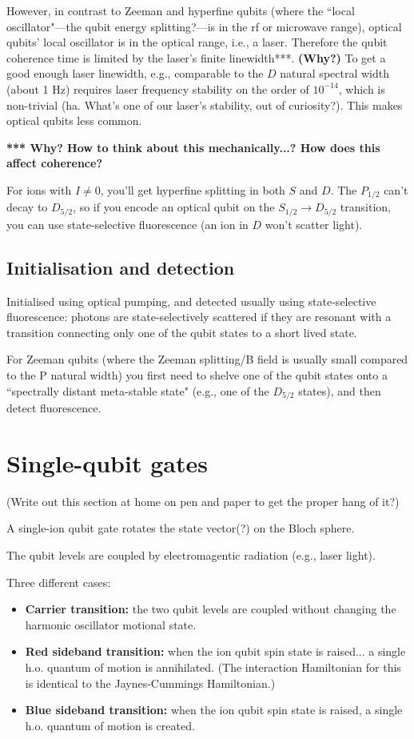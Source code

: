 \documentclass{article}
\begin{document}
However, in contrast to Zeeman and hyperfine qubits (where the ``local oscillator"---the qubit energy splitting?---is in the rf or microwave range), optical qubits' local oscillator is in the optical range, i.e., a laser. Therefore the qubit coherence time is limited by the laser's finite linewidth***. \textbf{(Why?)} To get a good enough laser linewidth, e.g., comparable to the $D$ natural spectral width (about 1 Hz) requires laser frequency stability on the order of $10^{-14}$, which is non-trivial (ha. What's one of our laser's stability, out of curiosity?). This makes optical qubits less common.

\textbf{*** Why? How to think about this mechanically...? How does this affect coherence?}

For ions with $I \neq 0$, you'll get hyperfine splitting in both $S$ and $D$. The $P_{1/2}$ can't decay to $D_{5/2}$, so if you encode an optical qubit on the $S_{1/2} \rightarrow D_{5/2}$ transition, you can use state-selective fluorescence (an ion in $D$ won't scatter light).


\subsection*{Initialisation and detection}

Initialised using optical pumping, and detected usually using state-selective fluorescence: photons are state-selectively scattered if they are resonant with a transition connecting only one of the qubit states to a short lived state.

For Zeeman qubits (where the Zeeman splitting/B field is usually small compared to the P natural width) you first need to shelve one of the qubit states onto a ``spectrally distant meta-stable state" (e.g., one of the $D_{5/2}$ states), and then detect fluorescence.


\section{Single-qubit gates}

(Write out this section at home on pen and paper to get the proper hang of it?)

A single-ion qubit gate rotates the state vector(?) on the Bloch sphere.

The qubit levels are coupled by electromagentic radiation (e.g., laser light).

Three different cases:

\begin{itemize}
\item \textbf{Carrier transition:} the two qubit levels are coupled without changing the harmonic oscillator motional state.
\item \textbf{Red sideband transition:} when the ion qubit spin state is raised... a single h.o. quantum of motion is annihilated. (The interaction Hamiltonian for this is identical to the Jaynes-Cummings Hamiltonian.)
\item \textbf{Blue sideband transition:} when the ion qubit spin state is raised, a single h.o. quantum of motion is created. 
\end{itemize}
\end{document}
